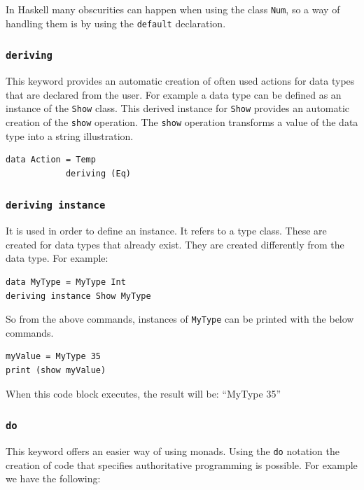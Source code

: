 \documentclass[a4paper, titlepage, twoside]{article}
\begin{document}
In Haskell many obscurities can happen when using the class \texttt{Num}, so a way of handling them is by using the \texttt{default} declaration.

\subsubsection{\texttt{deriving}}
\label{sec:org45c6575}

This keyword provides an automatic creation of often used actions for data types that are declared from the user. For example a data type can be defined as an instance of the \texttt{Show} class. This derived instance for \texttt{Show} provides an automatic creation of the \texttt{show} operation. The \texttt{show} operation transforms a value of the data type into a string illustration.

\begin{verbatim}
data Action = Temp
            deriving (Eq)
\end{verbatim}

\subsubsection{\texttt{deriving instance}}
\label{sec:orgc79c583}

It is used in order to define an instance. It refers to a type class. These are created for data types that already exist. They are created differently from the data type. For example:

\begin{verbatim}
data MyType = MyType Int
deriving instance Show MyType
\end{verbatim}

So from the above commands, instances of \texttt{MyType} can be printed with the below commands.

\begin{listing}[H]
\begin{verbatim}
myValue = MyType 35
print (show myValue)
\end{verbatim}
\caption{When this code block executes, the result will be: ``MyType 35''}
\end{listing}

\subsubsection{\texttt{do}}
\label{sec:org4e2b0f3}

This keyword offers an easier way of using monads. Using the \texttt{do} notation the creation of code that specifies authoritative programming is possible. For example we have the following:
\end{document}
